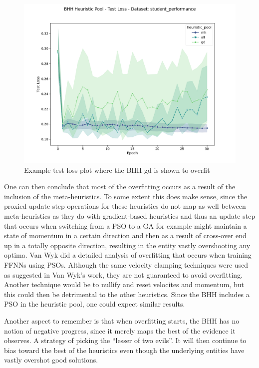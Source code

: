 \begin{figure}[htbp]
	\centering
    \includegraphics[width=\textwidth]{analysis/overfitting/student_performance.png}
    \caption{Example test loss plot where the \Ac{BHH}-gd is shown to overfit }
    \label{fig:results:overfitting:figures:gd-overfit}
\end{figure}
	
	
One can then conclude that most of the overfitting occurs as a result of the inclusion of the meta-heuristics. To some extent this does make sense, since the proxied update step operations for these heuristics do not map as well between meta-heuristics as they do with gradient-based heuristics and thus an update step that occurs when switching from a \acs{PSO} to a \acs{GA} for example might maintain a state of momentum in a certain direction and then as a result of cross-over end up in a totally opposite direction, resulting in the entity vastly overshooting any optima. Van Wyk \cite{ref:vanwyk:2014} did a detailed analysis of overfitting that occurs when training \acp{FFNN} using \acp{PSO}. Although the same velocity clamping techniques were used as suggested in Van Wyk's work, they are not guaranteed to avoid overfitting. Another technique would be to nullify and reset velocites and momentum, but this could then be detrimental to the other heuristics. Since the \Ac{BHH} includes a \acs{PSO} in the heuristic pool, one could expect similar results.

Another aspect to remember is that when overfitting starts, the \Ac{BHH} has no notion of negative progress, since it merely maps the best of the evidence it observes. A strategy of picking the ``lesser of two evils''. It will then continue to bias toward the best of the heuristics even though the underlying entities have vastly overshot good solutions.

